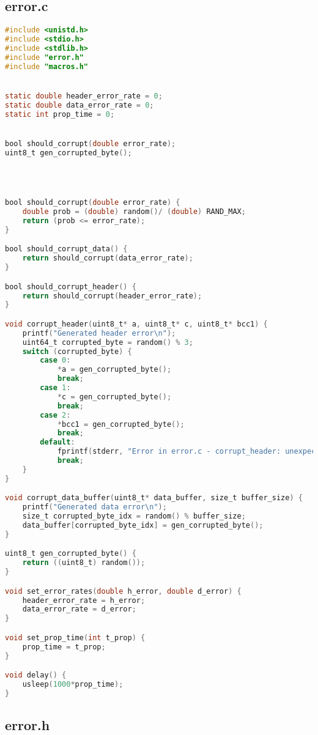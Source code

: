 \subsection{error.c}

\begin{lstlisting}[language=C, caption=error.c]
#include <unistd.h>
#include <stdio.h>
#include <stdlib.h>
#include "error.h"
#include "macros.h"


static double header_error_rate = 0;
static double data_error_rate = 0;
static int prop_time = 0;


bool should_corrupt(double error_rate);
uint8_t gen_corrupted_byte();




bool should_corrupt(double error_rate) {
    double prob = (double) random()/ (double) RAND_MAX;
    return (prob <= error_rate);
}

bool should_corrupt_data() {
    return should_corrupt(data_error_rate);
}

bool should_corrupt_header() {
    return should_corrupt(header_error_rate);
}

void corrupt_header(uint8_t* a, uint8_t* c, uint8_t* bcc1) {
    printf("Generated header error\n");
    uint64_t corrupted_byte = random() % 3;
    switch (corrupted_byte) {
        case 0:
            *a = gen_corrupted_byte();
            break;
        case 1:
            *c = gen_corrupted_byte();
            break;
        case 2:
            *bcc1 = gen_corrupted_byte();
            break;
        default:
            fprintf(stderr, "Error in error.c - corrupt_header: unexpected corrupted_byte\n");
            break;
    }
}

void corrupt_data_buffer(uint8_t* data_buffer, size_t buffer_size) {
    printf("Generated data error\n");
    size_t corrupted_byte_idx = random() % buffer_size;
    data_buffer[corrupted_byte_idx] = gen_corrupted_byte();
}

uint8_t gen_corrupted_byte() {
    return ((uint8_t) random());
}

void set_error_rates(double h_error, double d_error) {
    header_error_rate = h_error;
    data_error_rate = d_error;
}

void set_prop_time(int t_prop) {
    prop_time = t_prop;
}

void delay() {
    usleep(1000*prop_time);
}

\end{lstlisting}

\subsection{error.h}

